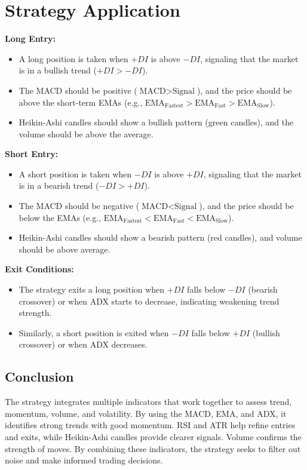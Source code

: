 \documentclass[12pt]{article}
\begin{document}
\section{Strategy Application}
\textbf{Long Entry:}
\begin{itemize}
    \item A long position is taken when $+DI$ is above $-DI$, signaling that the market is in a bullish trend ($+DI > -DI$).
    \item The MACD should be positive ($\text{MACD} > \text{Signal}$), and the price should be above the short-term EMAs (e.g., $\text{EMA}_{\text{Fastest}} > \text{EMA}_{\text{Fast}} > \text{EMA}_{\text{Slow}}$).
    \item Heikin-Ashi candles should show a bullish pattern (green candles), and the volume should be above the average.
\end{itemize}

\textbf{Short Entry:}
\begin{itemize}
    \item A short position is taken when $-DI$ is above $+DI$, signaling that the market is in a bearish trend ($-DI > +DI$).
    \item The MACD should be negative ($\text{MACD} < \text{Signal}$), and the price should be below the EMAs (e.g., $\text{EMA}_{\text{Fastest}} < \text{EMA}_{\text{Fast}} < \text{EMA}_{\text{Slow}}$).
    \item Heikin-Ashi candles should show a bearish pattern (red candles), and volume should be above average.
\end{itemize}

\textbf{Exit Conditions:}
\begin{itemize}
    \item The strategy exits a long position when $+DI$ falls below $-DI$ (bearish crossover) or when ADX starts to decrease, indicating weakening trend strength.
    \item Similarly, a short position is exited when $-DI$ falls below $+DI$ (bullish crossover) or when ADX decreases.
\end{itemize}

\subsection*{Conclusion}
The strategy integrates multiple indicators that work together to assess trend, momentum, volume, and volatility. By using the MACD, EMA, and ADX, it identifies strong trends with good momentum. RSI and ATR help refine entries and exits, while Heikin-Ashi candles provide clearer signals. Volume confirms the strength of moves. By combining these indicators, the strategy seeks to filter out noise and make informed trading decisions.
\end{document}
